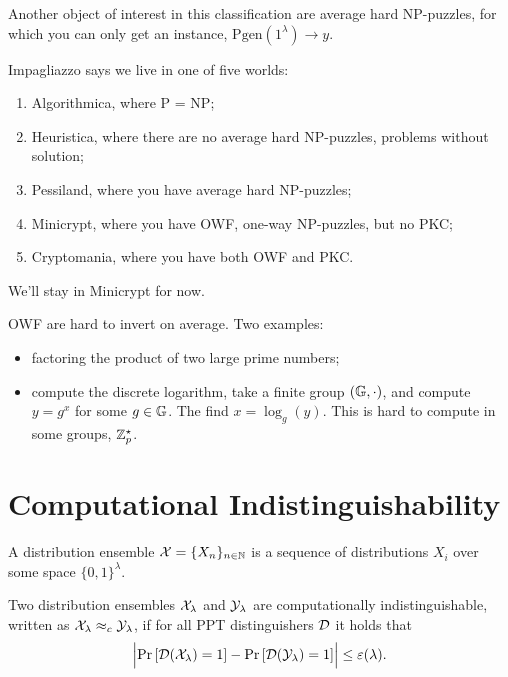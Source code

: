 Another object of interest in this classification are average hard NP-puzzles, for which you can only get an instance, \ie $\mathrm{Pgen}(1^{\lambda}) \to y$.

Impagliazzo says we live in one of five worlds:
\begin{enumerate}
	\item Algorithmica, where P = NP;
	\item Heuristica, where there are no average hard NP-puzzles, \ie problems without solution;
	\item Pessiland, where you have average hard NP-puzzles;
	\item Minicrypt, where you have \ac{OWF}, one-way NP-puzzles, but no \ac{PKC};
	\item Cryptomania, where you have both \ac{OWF} and \ac{PKC}.
\end{enumerate}
We'll stay in Minicrypt for now.

\ac{OWF} are hard to invert on average.
Two examples:
\begin{itemize}
	\item factoring the product of two large prime numbers;
	\item compute the discrete logarithm, \ie take a finite group $(\mathbb{G}, \cdot)$, and compute $y = g^x$ for some $g \in \mathbb{G}$.
	The find $x = \log_{g}(y)$.
	This is hard to compute in some groups, \eg $\mathbb{Z}^{\star}_{p}$.
\end{itemize}

\section{Computational Indistinguishability}

\begin{definition}
	A distribution ensemble $\mathcal{X} = \{ X_n \}_{n \in \mathbb{N}}$ is a sequence of distributions $X_i$ over some space $\{0,1\}^{\lambda}$.
\end{definition}

\begin{definition}
	Two distribution ensembles $\mathcal{X}_{\lambda}$ and $\mathcal{Y}_{\lambda}$ are computationally indistinguishable, written as $\mathcal{X}_{\lambda} \approx_c \mathcal{Y}_{\lambda}$, if for all \ac{PPT} distinguishers $\mathcal{D}$ it holds that
	\begin{equation*}
		\left|{\mathop{\mathrm{Pr}}\limits_{} \left[ {\mathcal{D}(\mathcal{X}_{\lambda}) = 1} \right] - \mathop{\mathrm{Pr}}\limits_{} \left[ {\mathcal{D}(\mathcal{Y}_{\lambda}) = 1} \right]}\right| \le \varepsilon(\lambda).
	\end{equation*}
\end{definition}


